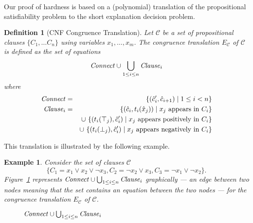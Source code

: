 \documentclass{easychair}
\newtheorem{example}{Example}
\newtheorem{definition}{Definition}
\begin{document}
\noindent Our proof of hardness is based on a (polynomial) 
translation of the propositional satisfiability problem to 
the short explanation decision problem.

\newcommand{\Assignment}{{\it Assignment}}
\newcommand{\Clause}{{\it Clause}}
\newcommand{\Connect}{{\it Connect}}

\begin{definition}[CNF Congruence Translation]

Let $\mathcal{C}$ be a set of propositional clauses $\{C_1,\ldots C_n\}$ using variables $x_1,\ldots,x_m$.
The congruence translation $E_{\mathcal{C}}$ of $\mathcal{C}$ is defined as the set of equations
\begin{equation*}
\Connect \cup \bigcup_{1 \leq i \leq n}\Clause_i 
\end{equation*}
where
\begin{eqnarray*}
	\Connect &=& \{ (\hat{c}_{i}',\hat{c}_{i+1}) \mid 1 \leq i < n\}\\
        \Clause_i &=& \{ (\hat{c}_i, t_i(\hat{x}_j)) \mid x_j \text{ appears in } C_i \}\\
           & & \cup\ \{ (t_i(\top_j), \hat{c}_i') \mid x_j \text{ appears positively in } C_i \}\\
           & & \cup\ \{ (t_i(\bot_j), \hat{c}_i') \mid x_j \text{ appears negatively in } C_i \}
\end{eqnarray*}

\end{definition}

\noindent This translation is illustrated by the following example.

\begin{example}\label{ex:np1}
Consider the set of clauses $\mathcal{C}$
\begin{equation*}
\big\{C_1 = x_1 \vee x_2 \vee \neg x_3, C_2 = \neg x_2 \vee x_3, C_3 = \neg x_1 \vee \neg x_2\big\}.
\end{equation*}
Figure~\ref{fig:npexamplebig} represents $\Connect \cup \bigcup_{1 \leq i \leq n}\Clause_i$
graphically --- an edge between two nodes meaning that the set contains an
equation between the two nodes --- for the congruence translation $E_{\mathcal{C}}$ of
$\mathcal{C}$.

\begin{figure}[ht]

\caption{$\Connect \cup \bigcup_{1 \leq i \leq n}\Clause_i$}
\label{fig:npexamplebig}
\end{figure}

\end{example}
\end{document}
